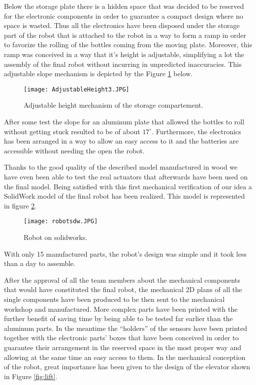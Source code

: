 Below the storage plate there is a hidden space that was decided to be reserved for the electronic components in order to guarantee a compact design where no space is wasted.
Thus all the electronics have been disposed under the storage part of the robot that is attached to the robot in a way to form a ramp in order to favorize the rolling of the bottles coming from the moving plate.
Moreover, this ramp was conceived in a way that it's height is adjustable, simplifying a lot the assembly of the final robot without incurring in unpredicted inaccuracies.
This adjustable slope mechanism is depicted by the Figure \ref{fig:AdjustableHeight3} below.

\begin{figure}[H]
 \centering
 \texttt{[image: AdjustableHeight3.JPG]}
 \caption{Adjustable height mechanism of the storage compartement.}
\label{fig:AdjustableHeight3}
\end{figure}

After some test the slope for an aluminum plate that allowed the bottles to roll without getting stuck resulted to be of about $17^{\circ}$.
Furthermore, the electronics has been arranged in a way to allow an easy access to it and the batteries are accessible without needing the open the robot.

Thanks to the good quality of the described model manufactured in wood we have even been able to test the real actuators that afterwards have been used on the final model.
Being satisfied with this first mechanical verification of our idea a SolidWork model of the final robot has been realized.
This model is represented in figure \ref{fig:robotsdw}.

\begin{figure}[H]
 \centering
 \texttt{[image: robotsdw.JPG]}
 \caption{Robot on solidworks.}
\label{fig:robotsdw}
\end{figure}

With only 15 manufactured parts, the robot's design was simple and it took less than a day to assemble.

After the approval of all the team members about the mechanical components that would have constituted the final robot, the mechanical 2D plans of all the single components have been produced to be then sent to the mechanical workshop and manufactured.
More complex parts have been printed with the further benefit of saving time by being able to be tested far earlier than the aluminum parts.
 In the meantime the “holders” of the sensors have been printed together with the electronic parts' boxes that have been conceived in order to guarantee their arrangement in the reserved space in the most proper way and allowing at the same time an easy access to them.
In the mechanical conception of the robot, great importance has been given to the design of the elevator shown in Figure \ref{fig:lift}.

